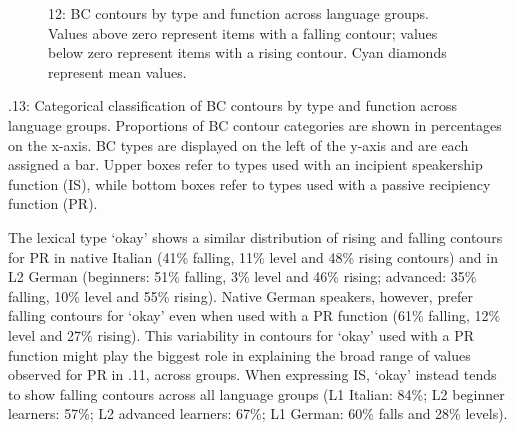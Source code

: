   
 

\begin{stylecaption}\begin{figure}
\caption{12: BC contours by type and function across language groups. Values above zero represent items with a falling contour; values below zero represent items with a rising contour. Cyan diamonds represent mean values.}
\label{fig:key:4}
\end{figure}\end{stylecaption}

\begin{stylecaption}
  
 .13: Categorical classification of BC contours by type and function across language groups. Proportions of BC contour categories are shown in percentages on the x-axis. BC types are displayed on the left of the y-axis and are each assigned a bar. Upper boxes refer to types used with an incipient speakership function (IS), while bottom boxes refer to types used with a passive recipiency function (PR).
\end{stylecaption}

The lexical type ‘okay’ shows a similar distribution of rising and falling contours for PR in native Italian (41\% falling, 11\% level and 48\% rising contours) and in L2 German (beginners: 51\% falling, 3\% level and 46\% rising; advanced: 35\% falling, 10\% level and 55\% rising). Native German speakers, however, prefer falling contours for ‘okay’ even when used with a PR function (61\% falling, 12\% level and 27\% rising). This variability in contours for ‘okay’ used with a PR function might play the biggest role in explaining the broad range of values observed for PR in .11, across groups. When expressing IS, ‘okay’ instead tends to show falling contours across all language groups (L1 Italian: 84\%; L2 beginner learners: 57\%; L2 advanced learners: 67\%; L1 German: 60\% falls and 28\% levels).

